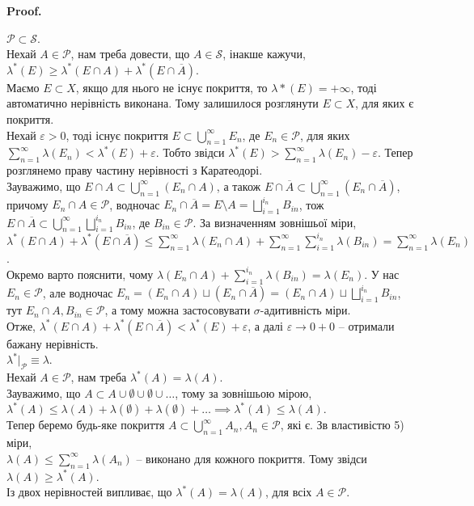 \documentclass[a4paper, 10pt]{article}
\makeatletter
\theoremstyle{theoremdd}
\renewenvironment{proof}[1][Proof.\\]{\par
\pushQED{\hfill \qed}%
\normalfont \topsep6\p@\@plus6\p@\relax
\trivlist
\item\relax
{\bfseries
#1\@addpunct{.}}\hspace\labelsep\ignorespaces
}{%
\popQED\endtrivlist\@endpefalse
}
\makeatother
\begin{document}
\begin{proof}
$\mathcal{P} \subset \mathcal{S}$.\\
Нехай $A \in \mathcal{P}$, нам треба довести, що $A \in \mathcal{S}$, інакше кажучи, $\lambda^*(E) \geq \lambda^*(E \cap A) + \lambda^*(E \cap \overline{A})$.\\
Маємо $E \subset X$, якщо для нього не існує покриття, то $\lambda*(E) = +\infty$, тоді автоматично нерівність виконана. Тому залишилося розглянути $E \subset X$, для яких є покриття.\\
Нехай $\varepsilon > 0$, тоді існує покриття $E \subset \displaystyle\bigcup_{n=1}^\infty E_n$, де $E_n \in \mathcal{P}$, для яких $\displaystyle\sum_{n=1}^\infty \lambda(E_n) < \lambda^*(E) + \varepsilon$. Тобто звідси $\lambda^*(E) > \displaystyle\sum_{n=1}^\infty \lambda(E_n) - \varepsilon$. Тепер розглянемо праву частину нерівності з Каратеодорі.\\
Зауважимо, що $E \cap A \subset \displaystyle\bigcup_{n=1}^\infty (E_n \cap A)$, а також $E \cap \overline{A} \subset \displaystyle\bigcup_{n=1}^\infty (E_n \cap \overline{A})$, причому $E_n \cap A \in \mathcal{P}$, водночас $E_n \cap \overline{A} = E \setminus A = \displaystyle\bigsqcup_{i=1}^{i_n} B_{in}$, тож $E \cap \overline{A} \subset \displaystyle\bigcup_{n=1}^\infty \bigsqcup_{i=1}^{i_n} B_{in}$, де $B_{in} \in \mathcal{P}$. За визначенням зовнішьої міри,\\
$\lambda^*(E \cap A) + \lambda^*(E \cap \overline{A}) \leq \displaystyle\sum_{n=1}^\infty \lambda(E_n \cap A) + \sum_{n=1}^\infty \sum_{i=1}^{i_n} \lambda(B_{in}) = \sum_{n=1}^\infty \lambda(E_n)$.\\
Окремо варто пояснити, чому $\lambda(E_n \cap A) + \displaystyle\sum_{i=1}^{i_n} \lambda(B_{in}) = \lambda(E_n)$. У нас $E_n \in \mathcal{P}$, але водночас $\displaystyle E_n = (E_n \cap A) \sqcup (E_n \cap \overline{A}) = (E_n \cap A) \sqcup \bigsqcup_{i=1}^{i_n}B_{in}$, тут $E_n \cap A, B_{in} \in \mathcal{P}$, а тому можна застосовувати $\sigma$-адитивність міри.\\
Отже, $\lambda^*(E \cap A) + \lambda^*(E \cap \overline{A}) < \lambda^*(E) + \varepsilon$, а далі $\varepsilon \to 0+0$ -- отримали бажану нерівність.
\bigskip \\
$\lambda^*|_\mathcal{P} \equiv \lambda$.\\
Нехай $A \in \mathcal{P}$, нам треба $\lambda^*(A) = \lambda(A)$.\\
Зауважимо, що $A \subset A \cup \emptyset \cup \emptyset \cup \dots$, тому за зовнішьою мірою, $\lambda^*(A) \leq \lambda(A) + \lambda(\emptyset) + \lambda(\emptyset) + \dots \implies \lambda^*(A) \leq \lambda(A)$.\\
Тепер беремо будь-яке покриття $A \subset \displaystyle\bigcup_{n=1}^\infty A_n, A_n \in \mathcal{P}$, які є. Зв властивістю 5) міри,\\
$\lambda(A) \leq \displaystyle\sum_{n=1}^\infty \lambda(A_n)$ -- виконано для кожного покриття. Тому звідси $\lambda(A) \geq \lambda^*(A)$.\\
Із двох нерівностей випливає, що $\lambda^*(A) = \lambda(A)$, для всіх $A \in \mathcal{P}$.
\end{proof}
\end{document}
